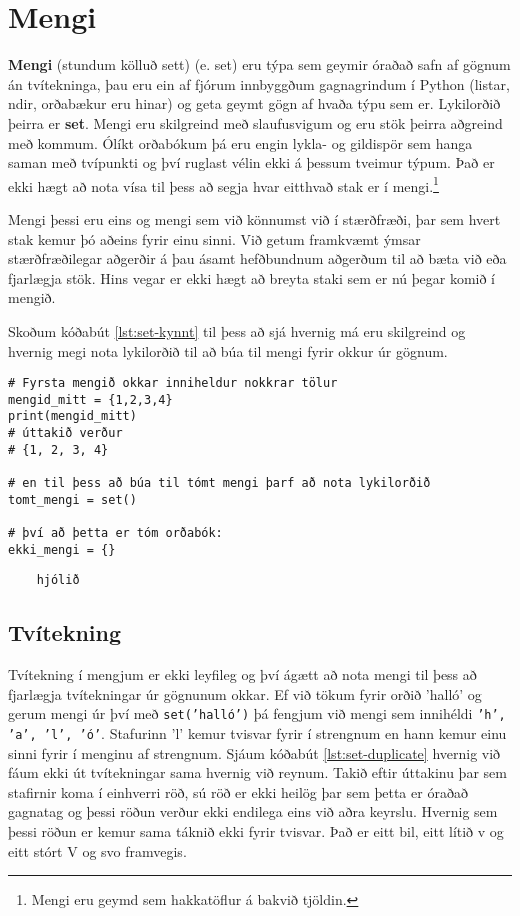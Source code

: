 
\chapter{Mengi}\label{k:sett}
\textbf{Mengi} (stundum kölluð sett) (e. set) eru týpa sem geymir óraðað safn af gögnum án tvítekninga, þau eru ein af fjórum innbyggðum gagnagrindum í Python (listar, ndir, orðabækur eru hinar) og geta geymt gögn af hvaða týpu sem er.
Lykilorðið þeirra er \textbf{set}.
Mengi eru skilgreind með slaufusvigum og eru stök þeirra aðgreind með kommum.
Ólíkt orðabókum þá eru engin lykla- og gildispör sem hanga saman með tvípunkti og því ruglast vélin ekki á þessum tveimur týpum.
Það er ekki hægt að nota vísa til þess að segja hvar eitthvað stak er í mengi.\footnote{Mengi eru geymd sem hakkatöflur á bakvið tjöldin.}

Mengi þessi eru eins og mengi sem við könnumst við í stærðfræði, þar sem hvert stak kemur þó aðeins fyrir einu sinni.
Við getum framkvæmt ýmsar stærðfræðilegar aðgerðir á þau ásamt hefðbundnum aðgerðum til að bæta við eða fjarlægja stök.
Hins vegar er ekki hægt að breyta staki sem er nú þegar komið í mengið.

Skoðum kóðabút \ref{lst:set-kynnt} til þess að sjá hvernig má eru skilgreind og hvernig megi nota lykilorðið til að búa til mengi fyrir okkur úr gögnum.

\begin{lstlisting}[caption=Mengi skilgreind, label=lst:set-kynnt]
# Fyrsta mengið okkar inniheldur nokkrar tölur
mengid_mitt = {1,2,3,4}
print(mengid_mitt)
# úttakið verður 
# {1, 2, 3, 4}

# en til þess að búa til tómt mengi þarf að nota lykilorðið
tomt_mengi = set()

# því að þetta er tóm orðabók:
ekki_mengi = {}
\end{lstlisting}
\lstset{style=uttak}
\begin{lstlisting}
	hjólið
\end{lstlisting}
\lstset{style=venjulegt}

\section{Tvítekning}
Tvítekning í mengjum er ekki leyfileg og því ágætt að nota mengi til þess að fjarlægja tvítekningar úr gögnunum okkar.
Ef við tökum fyrir orðið 'halló' og gerum mengi úr því með \texttt{set('halló')} þá fengjum við mengi sem innihéldi \texttt{'h', 'a', 'l', 'ó'}.
Stafurinn 'l' kemur tvisvar fyrir í strengnum en hann kemur einu sinni fyrir í menginu af strengnum.
Sjáum kóðabút \ref{lst:set-duplicate} hvernig við fáum ekki út tvítekningar sama hvernig við reynum.
Takið eftir úttakinu þar sem stafirnir koma í einhverri röð, sú röð er ekki heilög þar sem þetta er óraðað gagnatag og þessi röðun verður ekki endilega eins við aðra keyrslu.
Hvernig sem þessi röðun er kemur sama táknið ekki fyrir tvisvar.
Það er eitt bil, eitt lítið v og eitt stórt V og svo framvegis.

